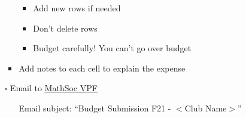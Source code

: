 \documentclass[utf8]{article}
\makeatletter
\newcommand{\termandyear}{F21 }
\newcommand{\MathSocVPF}{\href{mailto:vpf@mathsoc.uwaterloo.ca}{\underline{MathSoc VPF} }}
\makeatother
\begin{document}
\begin{itemize}
\begin{itemize}
\begin{itemize}
\begin{itemize}
                \item Add new rows if needed
                \item Don't delete rows
                \item Budget carefully! You can’t go over budget
            \end{itemize}
            \item Add notes to each cell to explain the expense
        \end{itemize}
        \item[$\square$] Email to \MathSocVPF  
            \begin{itemize}
                \item[\textperiodcentered] Email subject: ``Budget Submission \termandyear - $<$Club Name$>$''
            \end{itemize}
                

\end{itemize}
\end{itemize}
\end{document}
